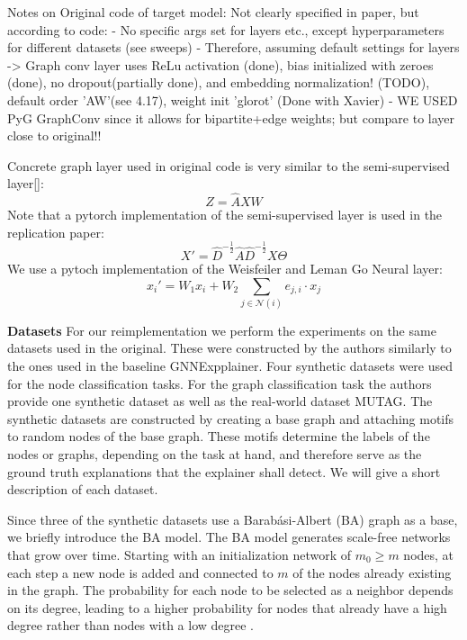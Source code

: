 Notes on Original code of target model: Not clearly specified in paper, but according to code:
- No specific args set for layers etc., except hyperparameters for different datasets (see sweeps)
- Therefore, assuming default settings for layers -> Graph conv layer uses ReLu activation (done), bias initialized with zeroes (done), no dropout(partially done), and embedding normalization! (TODO), default order 'AW'(see 4.17), weight init 'glorot' (Done with Xavier)
- WE USED PyG GraphConv since it allows for bipartite+edge weights; but compare to layer close to original!!\bigskip

Concrete graph layer used in original code is very similar to the semi-supervised layer\ref{}:
\begin{equation}
    Z = \hat{A}XW
\end{equation}
Note that a pytorch implementation of the semi-supervised layer is used in the replication paper:
\begin{equation}
    X' = \hat{D}^{-\frac{1}{2}}\hat{A}\hat{D}^{-\frac{1}{2}}X\Theta
\end{equation}
We use a pytoch implementation of the Weisfeiler and Leman Go Neural layer:
\begin{equation}
    x_i' = W_1x_i+W_2 \sum_{j\in\mathcal{N}(i)}e_{j,i}\cdot x_j
\end{equation}



\textbf{Datasets}
For our reimplementation we perform the experiments on the same datasets used in the original. These were constructed by the authors similarly to the ones used in the baseline GNNExpplainer. Four synthetic datasets were used for the node classification tasks. For the graph classification task the authors provide one synthetic dataset as well as the real-world dataset MUTAG. The synthetic datasets are constructed by creating a base graph and attaching motifs to random nodes of the base graph. These motifs determine the labels of the nodes or graphs, depending on the task at hand, and therefore serve as the ground truth explanations that the explainer shall detect. We will give a short description of each dataset.

Since three of the synthetic datasets use a Barabási-Albert (BA) graph as a base, we briefly introduce the BA model. The BA model generates scale-free networks that grow over time. Starting with an initialization network of $m_0 \geq m$ nodes, at each step a new node is added and connected to $m$ of the nodes already existing in the graph. The probability for each node to be selected as a neighbor depends on its degree, leading to a higher probability for nodes that already have a high degree rather than nodes with a low degree \cite{albert2002statistical}.

